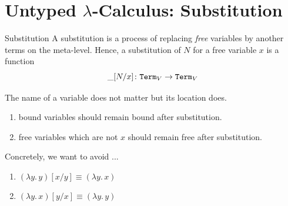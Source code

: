 \section{Untyped $\lambda$-Calculus: Substitution}

\begin{frame}{Substitution}
   A \alert{substitution} is a process of replacing \emph{free} variables by
   another terms on the meta-level. Hence, a substitution of $N$ for a free
   variable $x$ is a function
   \[
     {\_}[{N}/{x}]\colon \mathtt{Term}_V \to \mathtt{Term}_V
   \]

   The name of a variable does not matter but its location does.
   \begin{enumerate}
     \item bound variables should remain bound after substitution.
     \item free variables which are not $x$ should remain free after substitution.
   \end{enumerate}

   Concretely, we want to avoid ...
  \begin{enumerate}
    \item $(\lambda y.\,y)[x/y] \equiv (\lambda y.\, x)$
    \item $(\lambda y.\, x)[y/x] \equiv (\lambda y.\, y)$ 
  \end{enumerate}
   
  
\end{frame}
  
